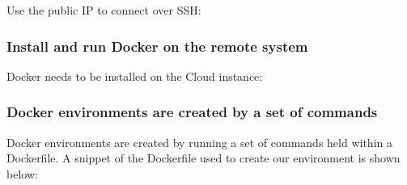 \begin{Shaded}
\begin{Highlighting}[]
\NormalTok{$ } 

\NormalTok{:}\KeywordTok{ [}
    \NormalTok{\{}
    \NormalTok{: \{}
        \NormalTok{: }\NormalTok{,}
        \NormalTok{: }
     \NormalTok{\}}
     \NormalTok{\}]}
\end{Highlighting}
\end{Shaded}

Use the public IP to connect over SSH:

\begin{Shaded}
\begin{Highlighting}[]
\NormalTok{$ } \KeywordTok{<}\KeywordTok{>} \KeywordTok{<}\KeywordTok{>}
\end{Highlighting}
\end{Shaded}

\subsubsection{Install and run Docker on the remote
system}\label{install-and-run-docker-on-the-remote-system}

Docker needs to be installed on the Cloud instance:

\begin{Shaded}
\begin{Highlighting}[]
\NormalTok{[} \NormalTok{~]$ sudo yum install -y docker}
\NormalTok{[} \NormalTok{~]$ sudo service docker start}
\end{Highlighting}
\end{Shaded}

\subsubsection{Docker environments are created by a set of
commands}\label{docker-environments-are-created-by-a-set-of-commands}

Docker environments are created by running a set of commands held within
a Dockerfile. A snippet of the Dockerfile used to create our environment
is shown below:

